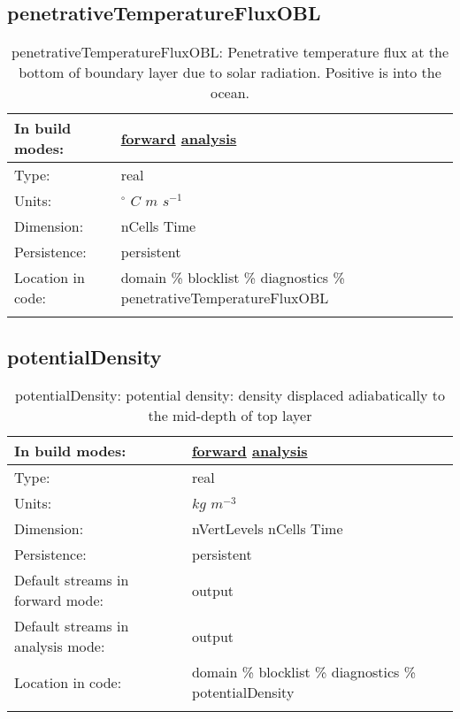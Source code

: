 \subsection[penetrativeTemperatureFluxOBL]{penetrativeTemperatureFluxOBL}
\label{subsec:var_sec_diagnostics_penetrativeTemperatureFluxOBL}
\begin{center}
\begin{longtable}{| p{2.0in} | p{4.0in} |}
        \hline 
        In build modes: & \hyperref[subsec:forward_var_tab_diagnostics]{forward} \hyperref[subsec:analysis_var_tab_diagnostics]{analysis} \\
        \hline 
        Type: & real \\
        \hline 
        Units: & $^\circ$ $C$ $m$ $s^{-1}$ \\
        \hline 
        Dimension: & nCells Time \\
        \hline 
        Persistence: & persistent \\
        \hline 
		 Location in code: & domain \% blocklist \% diagnostics \% penetrativeTemperatureFluxOBL \\
		 \hline 
    \caption{penetrativeTemperatureFluxOBL: Penetrative temperature flux at the bottom of boundary layer due to solar radiation. Positive is into the ocean.}
\end{longtable}
\end{center}
\subsection[potentialDensity]{potentialDensity}
\label{subsec:var_sec_diagnostics_potentialDensity}
\begin{center}
\begin{longtable}{| p{2.0in} | p{4.0in} |}
        \hline 
        In build modes: & \hyperref[subsec:forward_var_tab_diagnostics]{forward} \hyperref[subsec:analysis_var_tab_diagnostics]{analysis} \\
        \hline 
        Type: & real \\
        \hline 
        Units: & $kg$ $m^{-3}$ \\
        \hline 
        Dimension: & nVertLevels nCells Time \\
        \hline 
        Persistence: & persistent \\
        \hline 
		 Default streams in forward mode: &  output \\
        \hline 
		 Default streams in analysis mode: &  output \\
        \hline 
		 Location in code: & domain \% blocklist \% diagnostics \% potentialDensity \\
		 \hline 
    \caption{potentialDensity: potential density: density displaced adiabatically to the mid-depth of top layer}
\end{longtable}
\end{center}
